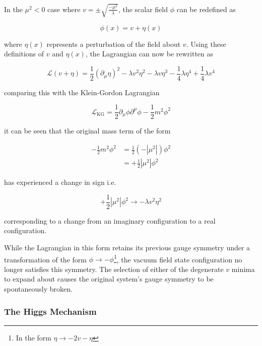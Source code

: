 \documentclass[12pt,a4paper,epsf,portrait,times,epsfig]{report}
\begin{document}
	In the $\mu^2 < 0$ case where $v = \pm \sqrt{\frac{-\mu^{2}}{\lambda}}$, the scalar field $\phi$ can be redefined as

	\begin{equation}
		\phi(x) = v + \eta(x)
	\end{equation}

	where $\eta(x)$ represents a perturbation of the field about $v$. Using these definitions of $v$ and $\eta(x)$, the Lagrangian can now be rewritten as

	\begin{equation}
		\mathcal{L}(v + \eta) = \frac{1}{2}(\partial_{\mu}\eta)^{2}-\lambda v^{2}\eta^{2}-\lambda v\eta^{3}-\frac{1}{4}\lambda\eta^{4}+\frac{1}{4}\lambda v^{4}
	\end{equation}

	comparing this with the Klein-Gordon Lagrangian

	\begin{equation}
		\mathcal{L}_{\mathrm{KG}} = \frac{1}{2}\partial_{\mu}\phi\partial^{\mu}\phi-\frac{1}{2}m^{2}\phi^{2}
	\end{equation}

	it can be seen that the original mass term of the form

	\begin{equation}
		\begin{split}
		-\frac{1}{2}m^{2}\phi^{2} &= \frac{1}{2}(-|\mu^{2}|)\phi^{2} \\
		&= +\frac{1}{2}|\mu^{2}|\phi^{2}
		\end{split}
	\end{equation}

	has experienced a change in sign i.e.

	\begin{equation}
		+\frac{1}{2}|\mu^{2}|\phi^{2} \rightarrow -\lambda v^{2}\eta^{2}
	\end{equation}

	corresponding to a change from an imaginary configuration to a real configuration. 

	While the Lagrangian in this form retains its previous gauge symmetry under a transformation of the form $\phi \rightarrow -\phi$\footnote{In the form $\eta \rightarrow -2v-\eta$}, the vacuum field state configuration no longer satisfies this symmetry. The selection of either of the degenerate $v$ minima to expand about causes the original system's gauge symmetry to be spontaneously broken. 

	\subsubsection{The Higgs Mechanism}
\end{document}
